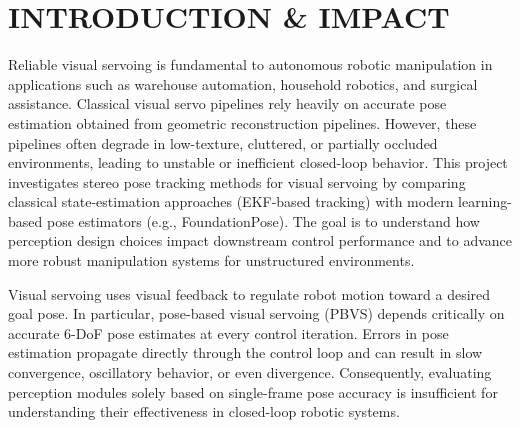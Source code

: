 \documentclass[letterpaper, 10 pt, conference]{ieeeconf}  %
\begin{document}



\section{INTRODUCTION \& IMPACT}

Reliable visual servoing is fundamental to autonomous robotic manipulation in applications such as warehouse automation, household robotics, and surgical assistance. Classical visual servo pipelines rely heavily on accurate pose estimation obtained from geometric reconstruction pipelines. However, these pipelines often degrade in low-texture, cluttered, or partially occluded environments, leading to unstable or inefficient closed-loop behavior. This project investigates stereo pose tracking methods for visual servoing by comparing classical state-estimation approaches (EKF-based tracking) with modern learning-based pose estimators (e.g., FoundationPose). The goal is to understand how perception design choices impact downstream control performance and to advance more robust manipulation systems for unstructured environments.

Visual servoing uses visual feedback to regulate robot motion toward a desired goal pose. In particular, pose-based visual servoing (PBVS) depends critically on accurate 6-DoF pose estimates at every control iteration. Errors in pose estimation propagate directly through the control loop and can result in slow convergence, oscillatory behavior, or even divergence. Consequently, evaluating perception modules solely based on single-frame pose accuracy is insufficient for understanding their effectiveness in closed-loop robotic systems.
\end{document}

